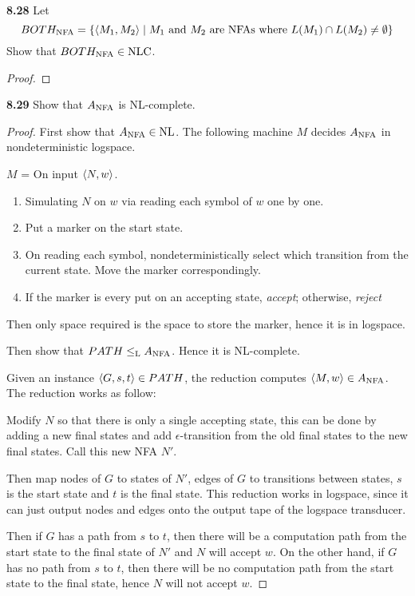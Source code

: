\label{lang:BOTHNFA_NLC}
\textbf{8.28} Let
\[
BOTH_{\text{NFA}} = \{\langle{M_1, M_2}\rangle \mid \text{$M_1$ and $M_2$ are NFAs where } L(M_1) \cap L(M_2) \neq \emptyset \}
\]
Show that $BOTH_{\text{NFA}} \in \text{NLC}$.
\begin{mdframed}
\begin{proof}

\end{proof}
\end{mdframed}


\label{lang:ANFA_NLC}
\textbf{8.29} Show that $A_{\text{NFA}}$ is NL-complete.
\begin{mdframed}
\begin{proof}
First show that $A_{\text{NFA}} \in \text{NL}$. The following machine $M$ decides $A_{\text{NFA}}$ in nondeterministic logspace.

\medskip
$M$ = On input $\langle{N, w}\rangle$.
\begin{enumerate}
\item Simulating $N$ on $w$ via reading each symbol of $w$ one by one.
\item Put a marker on the start state.
\item On reading each symbol, nondeterministically select which transition from the current state. Move the marker correspondingly.
\item If the marker is every put on an accepting state, \textit{accept}; otherwise, \textit{reject}
\end{enumerate}
Then only space required is the space to store the marker, hence it is in logspace.

\medskip
Then show that $PATH \leq_{\text{L}} A_{\text{NFA}}$. Hence it is NL-complete.

Given an instance $\langle{G, s, t}\rangle \in PATH$, the reduction computes $\langle{M, w}\rangle \in A_{\text{NFA}}$. The reduction works as follow:

Modify $N$ so that there is only a single accepting state, this can be done by adding a new final states and add $\epsilon$-transition from the old final states to the new final states. Call this new NFA $N'$.

Then map nodes of $G$ to states of $N'$, edges of $G$ to transitions between states, $s$ is the start state and $t$ is the final state. This reduction works in logspace, since it can just output nodes and edges onto the output tape of the logspace transducer.

Then if $G$ has a path from $s$ to $t$, then there will be a computation path from the start state to the final state of $N'$ and $N$ will accept $w$. On the other hand, if $G$ has no path from $s$ to $t$, then there will be no computation path from the start state to the final state, hence $N$ will not accept $w$.
\end{proof}
\end{mdframed}

